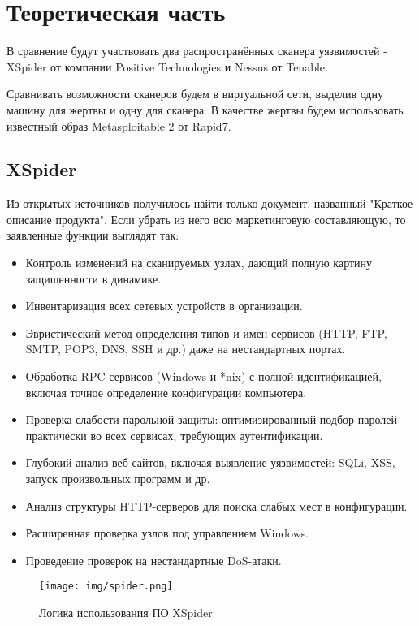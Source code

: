 \section{Теоретическая часть}

В сравнение будут участвовать два распространённых сканера уязвимостей - XSpider от компании Positive Technologies и Nessus от Tenable.

Сравнивать возможности сканеров будем в виртуальной сети, выделив одну машину для жертвы и одну для сканера. В качестве жертвы будем использовать известный образ Metasploitable 2 от Rapid7.

\subsection{XSpider}

Из открытых источников получилось найти только документ, названный "Краткое описание продукта". Если убрать из него всю маркетинговую составляющую, то заявленные функции выглядят так:

\begin{itemize}
\item Контроль изменений на сканируемых узлах, дающий полную картину защищенности в динамике.
­\item Инвентаризация всех сетевых устройств в организации.
­\item Эвристический метод определения типов и имен сервисов (HTTP, FTP, SMTP, POP3, DNS, SSH и др.) даже на нестандартных портах.
­\item Обработка RPC-сервисов (Windows и *nix) с полной идентификацией, включая точное определение конфигурации компьютера.
­\item Проверка слабости парольной защиты: оптимизированный подбор паролей практически во всех сервисах, требующих аутентификации.
­\item Глубокий анализ веб-сайтов, включая выявление уязвимостей: SQLi, XSS, запуск произвольных программ и др.
­\item Анализ структуры HTTP-серверов для поиска слабых мест в конфигурации.
­\item Расширенная проверка узлов под управлением Windows.
­\item Проведение проверок на нестандартные DoS-атаки.	
\end{itemize}

\begin{figure}[H]
	\centering
	\caption{Логика использования ПО XSpider}
	\texttt{[image: img/spider.png]}
\end{figure}


